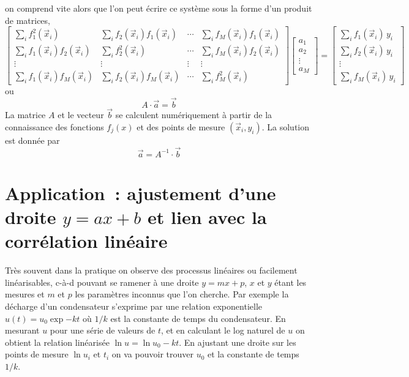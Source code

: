 on comprend vite alors que l'on peut écrire ce système sous la forme d'un produit de matrices,
\begin{equation}
\begin{bmatrix}
\sum_i f_1^2(\vec{x}_i)       & \sum_i f_2(\vec{x}_i)f_1(\vec{x}_i) & \cdots & \sum_i f_{M}(\vec{x}_i)f_1(\vec{x}_i)\\
\sum_i f_1(\vec{x}_i)f_2(\vec{x}_i) & \sum_i f_2^2(\vec{x}_i)       & \cdots & \sum_i f_{M}(\vec{x}_i)f_2(\vec{x}_i)\\
\vdots & \vdots & \vdots & \vdots \\
\sum_i f_1(\vec{x}_i)f_{M}(\vec{x}_i) & \sum_i f_2(\vec{x}_i)f_{M}(\vec{x}_i) & \cdots & \sum_i f_{M}^2(\vec{x}_i)
\end{bmatrix}
\begin{bmatrix} a_1 \\ a_2 \\ \vdots \\ a_{M}\end{bmatrix}=
\begin{bmatrix}
\sum_if_1(\vec{x}_i)\,y_i\\
\sum_if_2(\vec{x}_i)\,y_i\\
\vdots\\
\sum_if_{M}(\vec{x}_i)\,y_i
\end{bmatrix}\label{eq:emplrdp}
\end{equation}
ou
\begin{equation}
A\cdot\vec{a}=\vec{b}
\end{equation}
La matrice $A$ et le vecteur $\vec{b}$ se calculent numériquement à partir de la connaissance des fonctions $f_j(x)$ et des points de mesure $(\vec{x}_i,y_i)$. La solution est donnée par
\begin{equation}
\vec{a}=A^{-1}\cdot\vec{b}
\end{equation}

\section{Application~: ajustement d'une droite $y=ax+b$ et lien avec la corrélation linéaire}

Très souvent dans la pratique on observe des processus linéaires ou facilement linéarisables, c-à-d pouvant se ramener à une droite $y=mx+p$, $x$ et $y$ étant les mesures et $m$ et $p$ les paramètres inconnus que l'on cherche. Par exemple la décharge d'un condensateur s'exprime par une relation exponentielle $u(t)=u_0\exp{-kt}$ où $1/k$ est la constante de temps du condensateur. En mesurant $u$ pour une série de valeurs de $t$, et en calculant le log naturel de $u$ on obtient la relation linéarisée $\ln{u}=\ln{u_0}-kt$. En ajustant une droite sur les points de mesure $\ln{u_i}$ et $t_i$ on va pouvoir trouver $u_0$ et la constante de temps $1/k$.


